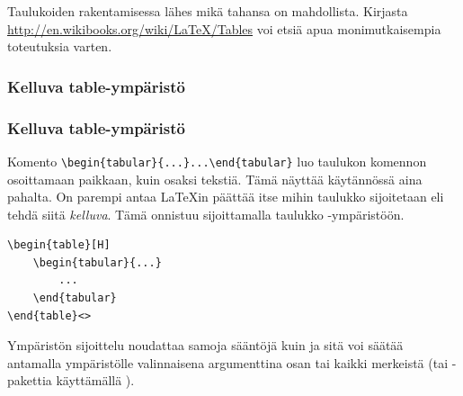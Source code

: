 \begin{frame}
    Taulukoiden rakentamisessa lähes mikä tahansa on mahdollista. Kirjasta \url{http://en.wikibooks.org/wiki/LaTeX/Tables} voi etsiä apua monimutkaisempia toteutuksia varten.
\end{frame}

%

\subsubsection{Kelluva table-ympäristö}
\begin{frame}[fragile]
    \frametitle{Kelluva table-ympäristö}
Komento \lstinline-\begin{tabular}{...}...\end{tabular}- luo taulukon komennon osoittamaan paikkaan, kuin osaksi tekstiä. Tämä näyttää käytännössä aina pahalta. 
    \vaihto
    On parempi antaa \LaTeX in päättää itse mihin taulukko sijoitetaan eli tehdä siitä \emph{kelluva}. Tämä onnistuu sijoittamalla taulukko -ympäristöön.
    \begin{lstlisting}
\begin{table}[H]
    \begin{tabular}{...}
        ...
    \end{tabular}
\end{table}<>
    \end{lstlisting}
    Ympäristön  sijoittelu noudattaa samoja sääntöjä kuin  ja sitä voi säätää antamalla ympäristölle valinnaisena argumenttina osan tai kaikki merkeistä  (tai -pakettia käyttämällä ).
\end{frame}

